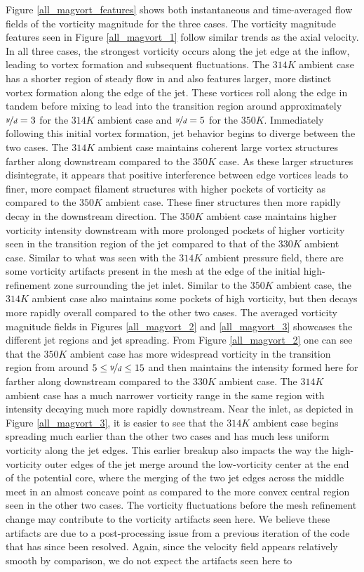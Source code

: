 Figure \ref{all_magvort_features} shows both instantaneous and time-averaged flow fields of the vorticity magnitude for the three cases. The vorticity magnitude features seen in Figure \ref{all_magvort_1} follow similar trends as the axial velocity. In all three cases, the strongest vorticity occurs along the jet edge at the inflow, leading to vortex formation and subsequent fluctuations. The $314 K$ ambient case has a shorter region of steady flow in and also features larger, more distinct vortex formation along the edge of the jet. These vortices roll along the edge in tandem before mixing to lead into the transition region around approximately $\nicefrac{y}{d} = 3$ for the $314 K$ ambient case and $\nicefrac{y}{d} = 5$ for the $350 K$. Immediately following this initial vortex formation, jet behavior begins to diverge between the two cases. The $314 K$ ambient case maintains coherent large vortex structures farther along downstream compared to the $350 K$ case. As these larger structures disintegrate, it appears that positive interference between edge vortices leads to finer, more compact filament structures with higher pockets of vorticity as compared to the $350 K$ ambient case. These finer structures then more rapidly decay in the downstream direction. The $350 K$ ambient case maintains higher vorticity intensity downstream with more prolonged pockets of higher vorticity seen in the transition region of the jet compared to that of the $330 K$ ambient case. Similar to what was seen with the $314 K$ ambient pressure field, there are some vorticity artifacts present in the mesh at the edge of the initial high-refinement zone surrounding the jet inlet. Similar to the $350 K$ ambient case, the $314 K$ ambient case also maintains some pockets of high vorticity, but then decays more rapidly overall compared to the other two cases. The averaged vorticity magnitude fields in Figures \ref{all_magvort_2} and \ref{all_magvort_3} showcases the different jet regions and jet spreading. From Figure \ref{all_magvort_2} one can see that the $350 K$ ambient case has more widespread vorticity in the transition region from around $5 \leq \nicefrac{y}{d} \leq 15$ and then maintains the intensity formed here for farther along downstream compared to the $330 K$ ambient case. The $314 K$ ambient case has a much narrower vorticity range in the same region with intensity decaying much more rapidly downstream. Near the inlet, as depicted in Figure \ref{all_magvort_3}, it is easier to see that the $314 K$ ambient case begins spreading much earlier than the other two cases and has much less uniform vorticity along the jet edges. This earlier breakup also impacts the way the high-vorticity outer edges of the jet merge around the low-vorticity center at the end of the potential core, where the merging of the two jet edges across the middle meet in an almost concave point as compared to the more convex central region seen in the other two cases. The vorticity fluctuations before the mesh refinement change may contribute to the vorticity artifacts seen here. We believe these artifacts are due to a post-processing issue from a previous iteration of the code that has since been resolved. Again, since the velocity field appears relatively smooth by comparison, we do not expect the artifacts seen here to 